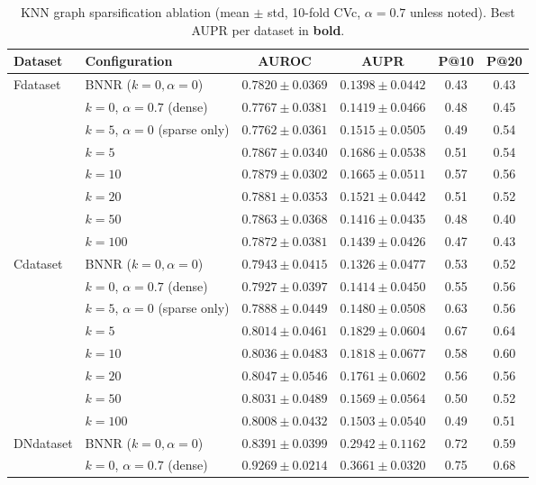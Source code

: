 \documentclass[webpdf,modern,large]{oup-authoring-template}
\begin{document}
\begin{table}[tb]
\centering
\caption{KNN graph sparsification ablation (mean $\pm$ std, 10-fold CVc, $\alpha=0.7$ unless noted). Best AUPR per dataset in \textbf{bold}.}
\label{tab:knn}
\small
\begin{tabular}{llcccc}
\toprule
Dataset & Configuration & AUROC & AUPR & P@10 & P@20 \\
\midrule
\multirow{7}{*}{Fdataset}
& BNNR ($k{=}0,\alpha{=}0$) & $0.7820 \pm 0.0369$ & $0.1398 \pm 0.0442$ & 0.43 & 0.43 \\
& $k=0$, $\alpha=0.7$ (dense) & $0.7767 \pm 0.0381$ & $0.1419 \pm 0.0466$ & 0.48 & 0.45 \\
& $k=5$, $\alpha=0$ (sparse only) & $0.7762 \pm 0.0361$ & $0.1515 \pm 0.0505$ & 0.49 & 0.54 \\
& \textbf{$k=5$} & $0.7867 \pm 0.0340$ & $\mathbf{0.1686 \pm 0.0538}$ & 0.51 & 0.54 \\
& $k=10$ & $0.7879 \pm 0.0302$ & $0.1665 \pm 0.0511$ & 0.57 & 0.56 \\
& $k=20$ & $0.7881 \pm 0.0353$ & $0.1521 \pm 0.0442$ & 0.51 & 0.52 \\
& $k=50$ & $0.7863 \pm 0.0368$ & $0.1416 \pm 0.0435$ & 0.48 & 0.40 \\
& $k=100$ & $0.7872 \pm 0.0381$ & $0.1439 \pm 0.0426$ & 0.47 & 0.43 \\
\midrule
\multirow{8}{*}{Cdataset}
& BNNR ($k{=}0,\alpha{=}0$) & $0.7943 \pm 0.0415$ & $0.1326 \pm 0.0477$ & 0.53 & 0.52 \\
& $k=0$, $\alpha=0.7$ (dense) & $0.7927 \pm 0.0397$ & $0.1414 \pm 0.0450$ & 0.55 & 0.56 \\
& $k=5$, $\alpha=0$ (sparse only) & $0.7888 \pm 0.0449$ & $0.1480 \pm 0.0508$ & 0.63 & 0.56 \\
& \textbf{$k=5$} & $0.8014 \pm 0.0461$ & $\mathbf{0.1829 \pm 0.0604}$ & 0.67 & 0.64 \\
& $k=10$ & $0.8036 \pm 0.0483$ & $0.1818 \pm 0.0677$ & 0.58 & 0.60 \\
& $k=20$ & $0.8047 \pm 0.0546$ & $0.1761 \pm 0.0602$ & 0.56 & 0.56 \\
& $k=50$ & $0.8031 \pm 0.0489$ & $0.1569 \pm 0.0564$ & 0.50 & 0.52 \\
& $k=100$ & $0.8008 \pm 0.0432$ & $0.1503 \pm 0.0540$ & 0.49 & 0.51 \\
\midrule
\multirow{8}{*}{DNdataset}
& BNNR ($k{=}0,\alpha{=}0$) & $0.8391 \pm 0.0399$ & $0.2942 \pm 0.1162$ & 0.72 & 0.59 \\
& $k=0$, $\alpha=0.7$ (dense) & $0.9269 \pm 0.0214$ & $0.3661 \pm 0.0320$ & 0.75 & 0.68 \\

\end{tabular}
\end{table}
\end{document}
